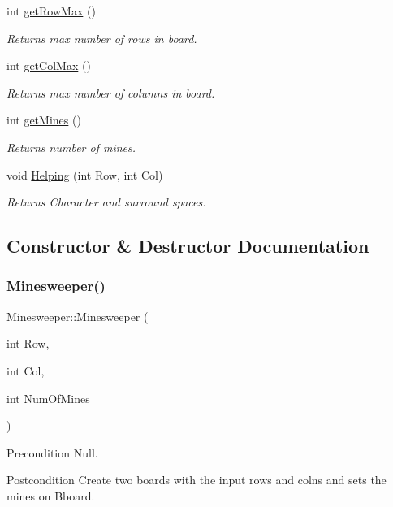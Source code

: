 \begin{DoxyCompactItemize}
int \mbox{\hyperlink{class_minesweeper_aad4e9c313183fa9eeb90cef65f325026}{get\+Row\+Max}} ()
\begin{DoxyCompactList}\small\item\em Returns max number of rows in board. \end{DoxyCompactList}\item 
int \mbox{\hyperlink{class_minesweeper_a3242aa1da6bd80bf7a94d7b4c5ca743a}{get\+Col\+Max}} ()
\begin{DoxyCompactList}\small\item\em Returns max number of columns in board. \end{DoxyCompactList}\item 
int \mbox{\hyperlink{class_minesweeper_a3ea6ef07c7a730c815ff62d213ca72af}{get\+Mines}} ()
\begin{DoxyCompactList}\small\item\em Returns number of mines. \end{DoxyCompactList}\item 
void \mbox{\hyperlink{class_minesweeper_a563e151311a5b9965f523a5faaf13124}{Helping}} (int Row, int Col)
\begin{DoxyCompactList}\small\item\em Returns Character and surround spaces. \end{DoxyCompactList}\end{DoxyCompactItemize}


\subsection{Constructor \& Destructor Documentation}
\mbox{\label{class_minesweeper_a9cb58f108f5f65317c5f7d60ead4e7ec}} 
\subsubsection{\texorpdfstring{Minesweeper()}{Minesweeper()}}
{\footnotesize\ttfamily Minesweeper\+::\+Minesweeper (\begin{DoxyParamCaption}\item[{int}]{Row,  }\item[{int}]{Col,  }\item[{int}]{Num\+Of\+Mines }\end{DoxyParamCaption})}

\begin{DoxyPrecond}{Precondition}
Null. 
\end{DoxyPrecond}
\begin{DoxyPostcond}{Postcondition}
Create two boards with the input rows and colns and sets the mines on Bboard. 
\end{DoxyPostcond}

